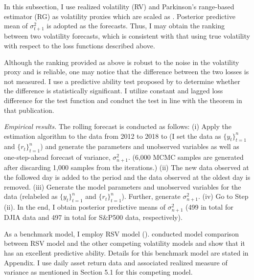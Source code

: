 \documentclass[11pt]{article}
\begin{document}
In this subsection, I use realized volatility (RV) and Parkinson's range-based estimator (RG) as volatility proxies which are scaled as \cite{HansenLunde(2006)}. 
Posterior predictive mean of $\sigma^2_{t+1}$ is adopted as the forecasts. 
Thus, I may obtain the ranking between two volatility forecasts, which is consistent with that using true volatility with respect to the loss functions described above. 

Although the ranking provided as above is robust to the noise in the volatility proxy and is reliable, 
one may notice that the difference between the two losses is not measured. 
I use a predictive ability test proposed by \cite{GiacominiWhite(2006)} to determine whether the difference is statistically significant. 
I utilize constant and lagged loss difference for the test function and conduct the test in line with the theorem in that publication.  

\vspace{0.5\baselineskip}

\noindent
{\it Empirical results.} 
The rolling forecast is conducted as follows: 
(i) Apply the estimation algorithm to the data from 2012 to 2018 to (I set the data as $\{y_t\}_{t=1}^n$ and $\{r_t\}_{t=1}^n$) and generate the parameters and unobserved variables as well as one-step-ahead forecast of variance, $\sigma^2_{n+1}$. 
(6,000 MCMC samples are generated after discarding 1,000 samples from the iterations.)
(ii) The new data observed at the followed day is added to the period and the data observed at the oldest day is removed. 
(iii) Generate the model parameters and unobserved variables for the data (relabeled as $\{y_t\}_{t=1}^n$ and $\{r_t\}_{t=1}^n$). Further, generate $\sigma^2_{n+1}$. 
(iv) Go to Step (ii). 
In the end, I obtain posterior predictive means of $\sigma^2_{n+1}$ (499 in total for DJIA data and 497 in total for S\&P500 data, respectively). 

As a benchmark model, I employ RSV model (\cite{Takahashi_etal(2009)}). 
\cite{Takahashi_etal(2021)} conducted model comparison between RSV model and the other competing volatility models and show that it has an excellent predictive ability. 
Details for this benchmark model are stated in Appendix. 
I use daily asset return data and associated realized measure of variance as mentioned in Section 5.1 for this competing model. 
\end{document}

